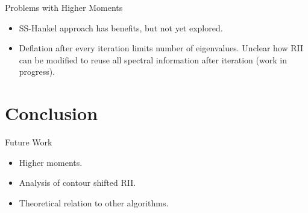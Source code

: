 \documentclass[mathserif, xcolor=table]{beamer}
\begin{document}



\begin{frame}{Problems with Higher Moments}

	\begin{itemize}
		\item SS-Hankel approach has benefits, but not yet explored.
			\vspace{2em}
		\item Deflation after every iteration limits number of eigenvalues. Unclear how RII can be modified to reuse all spectral information after iteration (work in progress).
		
	\end{itemize}

	
\end{frame}

\section{Conclusion}

\begin{frame}{Future Work}
	\begin{itemize}
		\item Higher moments.
		\vspace{1em}
		\item Analysis of contour shifted RII.
		\vspace{1em}
		\item Theoretical relation to other algorithms.
	\end{itemize}
\end{frame}
\end{document}
